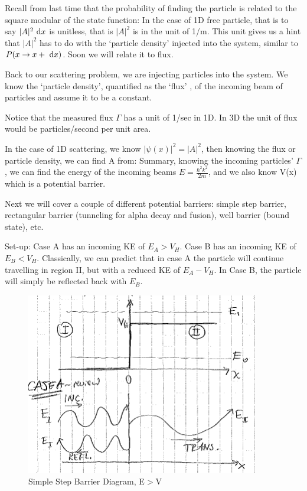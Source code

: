 \documentclass{school-22.101-notes}
\begin{document}
Recall from last time that the probability of finding the particle is related to the square modular of the state function:
In the case of 1D free particle, that is to say $|A|^2 \mbox{ }\mathrm{d} x$ is unitless, that is $|A|^2$ is in the unit of 1/m. This unit gives us a hint that $|A|^2$ has to do with the `particle density' injected into the system, similar to $P(x\to x+\mbox{ }\mathrm{d} x)$. Soon we will relate it to flux. 

Back to our scattering problem, we are injecting particles into the system. We know the `particle density', quantified as the `flux' , of the incoming beam of particles and assume it to be a constant. 

Notice that the measured flux $\Gamma$ has a unit of 1/sec in 1D. In 3D the unit of flux would be particles/second per unit area. 

In the case of 1D scattering, we know $|\psi(x)|^2 = |A|^2$, then knowing the flux or particle density, we can find A from:
Summary, knowing the incoming particles' $\Gamma$, we can find the energy of the incoming beams $E = \frac{\hbar^2 k^2}{2m}$, and we also know V(x) which is a potential barrier. 

Next we will cover a couple of different potential barriers: simple step barrier, rectangular barrier (tunneling for alpha decay and fusion), well barrier (bound state), etc. 

Set-up: Case A has an incoming KE of $E_A > V_H$. Case B has an incoming KE of $E_B < V_H$. Classically, we can predict that in case A the particle will continue travelling in region II, but with a reduced KE of $E_A - V_H$. In Case B, the particle will simply be reflected back with $E_B$. 


\begin{figure}[h!]
    \centering
    \includegraphics[width=4in]{images/qm/step-barrier-caseA.png}
    \caption{Simple Step Barrier Diagram, E$>$V}
\end{figure}
\end{document}
